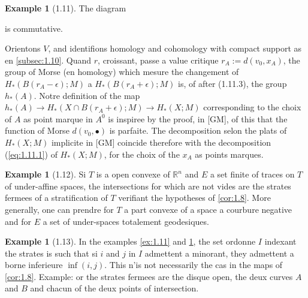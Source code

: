 \documentclass[11pt,a4paper]{article}
\theoremstyle{plain}
\theoremstyle{definition}
\newtheorem{example}[theorem]{Example}
\begin{document}
\begin{example}[1.11]
The diagram
is commutative.

Orientons $V$, and identifions homology and cohomology with compact support as en \ref{subsec:1.10}. Quand $r$, croissant, passe a value critique $r_A := d(v_0,x_A)$, the group of Morse (en homology) which mesure the changement of $H_*(B(r_A-\epsilon);M)$ a $H_*(B(r_A+\epsilon);M)$ is, of after (1.11.3), the group $h_*(A)$. Notre definition of the map $h_*(A) \to H_*(X \cap B(r_A+\epsilon);M) \to H_*(X;M)$ corresponding to the choix of $A$ as point marque in $A^0$ is inspiree by the proof, in [GM], of this that the function of Morse $d(v_0,\bullet)$ is parfaite. The decomposition selon the plats of $H_*(X;M)$ implicite in [GM] coincide therefore with the decomposition (\ref{eq:1.11.1}) of $H_*(X;M)$, for the choix of the $x_A$ as points marques.
\end{example}

\begin{example}[1.12]\label{ex:1.12}
Si $T$ is a open convexe of $\mathbb{R}^n$ and $E$ a set finite of traces on $T$ of under-affine spaces, the intersections for which are not vides are the strates fermees of a stratification of $T$ verifiant the hypotheses of \ref{cor:1.8}. More generally, one can prendre for $T$ a part convexe of a space a courbure negative and for $E$ a set of under-spaces totalement geodesiques.
\end{example}

\begin{example}[1.13]\label{ex:1.13}
In the examples \ref{ex:1.11} and \ref{ex:1.12}, the set ordonne $I$ indexant the strates is such that si $i$ and $j$ in $I$ admettent a minorant, they admettent a borne inferieure $\inf(i,j)$. This n'is not necessarily the cas in the maps of \ref{cor:1.8}. Example: or the strates fermees are the disque open, the deux curves $A$ and $B$ and chacun of the deux points of intersection.
\end{example}
\end{document}
